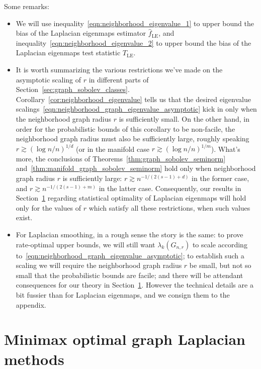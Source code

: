 \documentclass{article}
\newcommand{\1}{\mathbf{1}}
\newcommand{\wh}[1]{\widehat{#1}}
\newcommand{\LE}{\mathrm{LE}}
\theoremstyle{alden}
\theoremstyle{aldenthm}
\theoremstyle{definition}
\theoremstyle{remark}
\begin{document}
Some remarks:
\begin{itemize}
	\item We will use inequality~\eqref{eqn:neighborhood_eigenvalue_1} to upper bound the bias of the Laplacian eigenmaps estimator $\wh{f}_{\LE}$, and inequality~\eqref{eqn:neighborhood_eigenvalue_2} to upper bound the bias of the Laplacian eigenmaps test statistic $T_{\LE}$.
	\item It is worth summarizing the various restrictions we've made on the asymptotic scaling of $r$ in different parts of Section~\ref{sec:graph_sobolev_classes}. Corollary~\ref{cor:neighborhood_eigenvalue} tells us that the desired eigenvalue scalings~\eqref{eqn:neighborhood_graph_eigenvalue_asymptotic} kick in only when the neighborhood graph radius $r$ is sufficiently small. On the other hand, in order for the probabilistic bounds of this corollary to be non-facile, the neighborhood graph radius must also be sufficiently large, roughly speaking $r \gtrsim (\log n/n)^{1/d}$ (or in the manifold case $r \gtrsim (\log n/n)^{1/m}$). What's more, the conclusions of Theorems~\ref{thm:graph_sobolev_seminorm} and~\ref{thm:manifold_graph_sobolev_seminorm} hold only when neighborhood graph radius $r$ is sufficiently large: $r \gtrsim n^{-1/(2(s - 1) + d)}$ in the former case, and $r \gtrsim n^{-1/(2(s - 1) + m)}$ in the latter case. Consequently, our results in Section~\ref{sec:minimax_optimal_graph_Laplacian_methods} regarding statistical optimality of Laplacian eigenmaps will hold only for the values of $r$ which satisfy all these restrictions, when such values exist.
	\item For Laplacian smoothing, in a rough sense the story is the same: to prove rate-optimal upper bounds, we will still want $\lambda_k(G_{n,r})$ to scale according to~\eqref{eqn:neighborhood_graph_eigenvalue_asymptotic}; to establish such a scaling we will require the neighborhood graph radius $r$ be small, but not so small that the probabilistic bounds are facile; and there will be attendant consequences for our theory in Section~\ref{sec:minimax_optimal_graph_Laplacian_methods}. However the technical details are a bit fussier than for Laplacian eigenmaps, and we consign them to the appendix.
\end{itemize}

\section{Minimax optimal graph Laplacian methods}
\label{sec:minimax_optimal_graph_Laplacian_methods}
\end{document}
